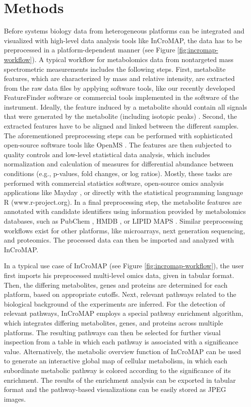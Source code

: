 \documentclass[final,5p,times,twocolumn]{elsarticle}
\newcommand\red[1]{{\color{red}#1}}
\begin{document}
\section{Methods}
Before systems biology data from heterogeneous platforms can be integrated and visualized with high-level data analysis tools like InCroMAP, the data has to be preprocessed in a platform-dependent manner (see Figure \ref{fig:incromap-workflow}). A typical workflow for metabolomics data from nontargeted mass spectrometric measurements includes the following steps. First, metabolite features, which are characterized by mass and relative intensity, are extracted from the raw data files by applying software tools, like our recently developed FeatureFinder software \cite{Kenar2014} or commercial tools implemented in the software of the instrument. Ideally, the feature induced by a metabolite should contain all signals that were generated by the metabolite (including isotopic peaks) \cite{Kenar2014}. Second, the extracted features have to be aligned and linked between the different samples. The aforementioned preprocessing steps can be performed with sophisticated open-source software tools like OpenMS \cite{Sturm2008}. The features are then subjected to quality controls and low-level statistical data analysis, which includes normalization and calculation of measures for differential abundance between conditions (e.g., p-values, fold changes, or log ratios). Mostly, these tasks are performed with commercial statistics software, open-source omics analysis applications like Mayday \cite{Battke2010}, or directly with the statistical programming language R (www.r-project.org). In a final preprocessing step, the metabolite features are annotated with candidate identifiers using information provided by metabolomics databases, such as PubChem \cite{Wang2009}, HMDB \cite{Wishart2009}, or LIPID MAPS \cite{Sud2007}. Similar preprocessing workflows exist for other platforms, like microarrays, next generation sequencing, and proteomics. The processed data can then be imported and analyzed with InCroMAP.

In a typical use case of InCroMAP (see Figure \ref{fig:incromap-workflow}), the user first imports his preprocessed multi-level omics data, given in tabular format. Then, the \red{differing metabolites, genes and proteins} are determined for each platform, based on appropriate cutoffs. Next, relevant pathways related to the biological background of the experiments are inferred. For the detection of relevant pathways, InCroMAP employs a special pathway enrichment algorithm, which integrates \red{differing metabolites, genes, and proteins} across multiple platforms. The resulting pathways can then be selected for further visual inspection from a table in which each pathway is associated with a significance value. Alternatively, the metabolic overview function of InCroMAP can be used to generate an interactive global map of cellular metabolism, in which each subordinate metabolic pathway is colored according to the significance of its enrichment. The results of the enrichment analysis can be 
exported in tabular format and the pathway-based visualizations can be easily stored as JPEG images.
\end{document}
